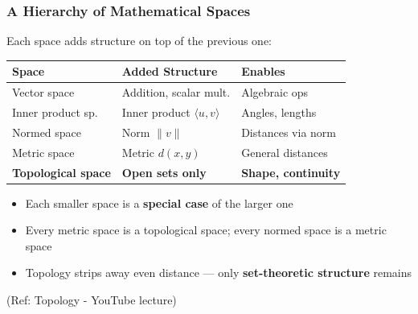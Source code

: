 \begin{frame}[fragile]\frametitle{A Hierarchy of Mathematical Spaces}

Each space adds structure on top of the previous one:

\vspace{0.2cm}
\begin{center}
\begin{tabular}{lll}
\hline
\textbf{Space} & \textbf{Added Structure} & \textbf{Enables} \\
\hline
Vector space      & Addition, scalar mult.  & Algebraic ops \\
Inner product sp. & Inner product $\langle u,v \rangle$ & Angles, lengths \\
Normed space      & Norm $\|v\|$            & Distances via norm \\
Metric space      & Metric $d(x,y)$         & General distances \\
\textbf{Topological space} & \textbf{Open sets only} & \textbf{Shape, continuity} \\
\hline
\end{tabular}
\end{center}

\vspace{0.2cm}
\begin{itemize}
  \item Each smaller space is a \textbf{special case} of the larger one
  \item Every metric space is a topological space; every normed space is a metric space
  \item Topology strips away even distance --- only \textbf{set-theoretic structure} remains
\end{itemize}

{\tiny (Ref: Topology - YouTube lecture)}
\end{frame}


